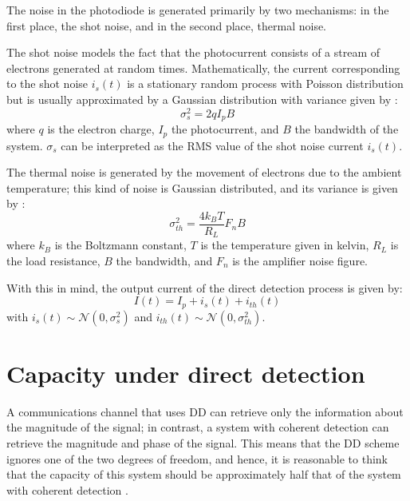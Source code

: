 The noise in the photodiode is generated primarily by two mechanisms: in the first place, the shot noise, and in the second place, thermal noise.

The shot noise models the fact that the photocurrent consists of a stream of electrons generated at random times. Mathematically, the current corresponding to the shot noise $i_s(t)$ is a stationary random process with Poisson distribution but is usually approximated by a Gaussian distribution with variance given by \cite{Agrawal_ch4}:
\begin{equation}
\sigma_s^2 = 2qI_pB
\label{eq:shot_noise_varaince}
\end{equation}
where $q$ is the electron charge, $I_p$ the photocurrent, and $B$ the bandwidth of the system. $\sigma_s$ can be interpreted as the RMS value of the shot noise current $i_s(t)$.

The thermal noise is generated by the movement  of electrons due to the ambient temperature; this kind of noise is Gaussian distributed, and its variance  is given by \cite{Agrawal_ch4}:
\begin{equation}
\sigma_{th}^2 = \frac{4k_BT}{R_L} F_nB
\label{eq:thermal_noise_variance}
\end{equation}
where $k_B$ is the Boltzmann constant, $T$ is the temperature given in kelvin, $R_L$ is the load resistance, $B$ the bandwidth, and $F_n$ is the amplifier noise figure. 

With this in mind, the output current of the direct detection process is given by:
\begin{equation}
I(t) = I_p+i_s(t)+i_{th}(t)
\label{eq:DD_current}
\end{equation}
with $i_s(t)\sim\mathcal{N}(0,\sigma_s^2)$ and $i_{th}(t)\sim\mathcal{N}(0,\sigma_{th}^2)$.



\section{Capacity under direct detection}
\label{sec:capacity_under_direct_detection}

A communications channel that uses DD can retrieve only the information about the magnitude of the signal; in contrast, a system with coherent detection can retrieve the magnitude and phase of the signal. This means that the DD scheme ignores one of the two degrees of freedom, and hence, it is reasonable to think that the capacity of this system should be approximately half that of the system with coherent detection \cite{Mecozzi_2018, Tasbihi_Tukey, Tasbihi_Capacity}.

